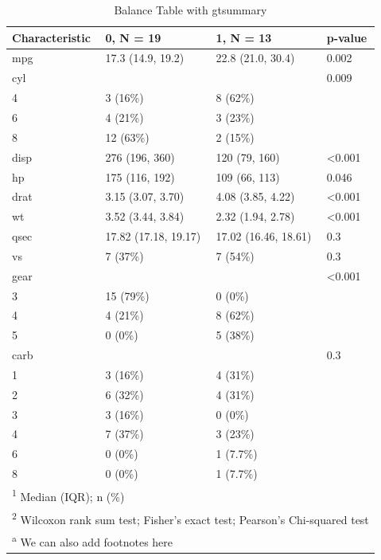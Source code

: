 \documentclass[
  11pt,
a4paper
]{article}
\begin{document}
\begin{table}

\caption{\label{tab:balance2}Balance Table with gtsummary}
\centering
\begin{tabular}[t]{llll}
\toprule
Characteristic & 0, N = 19 & 1, N = 13 & p-value\\
\midrule
mpg & 17.3 (14.9, 19.2) & 22.8 (21.0, 30.4) & 0.002\\
cyl &  &  & 0.009\\
\hspace{1em}4 & 3 (16\%) & 8 (62\%) & \\
\hspace{1em}6 & 4 (21\%) & 3 (23\%) & \\
\hspace{1em}8 & 12 (63\%) & 2 (15\%) & \\
\addlinespace
disp & 276 (196, 360) & 120 (79, 160) & <0.001\\
hp & 175 (116, 192) & 109 (66, 113) & 0.046\\
drat & 3.15 (3.07, 3.70) & 4.08 (3.85, 4.22) & <0.001\\
wt & 3.52 (3.44, 3.84) & 2.32 (1.94, 2.78) & <0.001\\
qsec & 17.82 (17.18, 19.17) & 17.02 (16.46, 18.61) & 0.3\\
\addlinespace
vs & 7 (37\%) & 7 (54\%) & 0.3\\
gear &  &  & <0.001\\
\hspace{1em}3 & 15 (79\%) & 0 (0\%) & \\
\hspace{1em}4 & 4 (21\%) & 8 (62\%) & \\
\hspace{1em}5 & 0 (0\%) & 5 (38\%) & \\
\addlinespace
carb &  &  & 0.3\\
\hspace{1em}1 & 3 (16\%) & 4 (31\%) & \\
\hspace{1em}2 & 6 (32\%) & 4 (31\%) & \\
\hspace{1em}3 & 3 (16\%) & 0 (0\%) & \\
\hspace{1em}4 & 7 (37\%) & 3 (23\%) & \\
\addlinespace
\hspace{1em}6 & 0 (0\%) & 1 (7.7\%) & \\
\hspace{1em}8 & 0 (0\%) & 1 (7.7\%) & \\
\bottomrule
\multicolumn{4}{l}{\rule{0pt}{1em}\textsuperscript{1} Median (IQR); n (\%)}\\
\multicolumn{4}{l}{\rule{0pt}{1em}\textsuperscript{2} Wilcoxon rank sum test; Fisher's exact test; Pearson's Chi-squared test}\\
\multicolumn{4}{l}{\textsuperscript{a} We can also add footnotes here}\\
\end{tabular}
\end{table}
\end{document}
